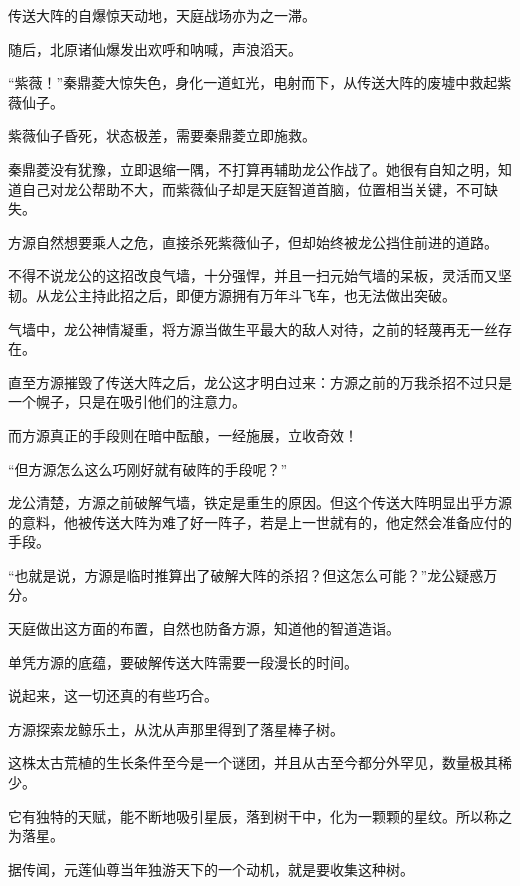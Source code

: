 
\begin{this_body}



传送大阵的自爆惊天动地，天庭战场亦为之一滞。

随后，北原诸仙爆发出欢呼和呐喊，声浪滔天。

“紫薇！”秦鼎菱大惊失色，身化一道虹光，电射而下，从传送大阵的废墟中救起紫薇仙子。

紫薇仙子昏死，状态极差，需要秦鼎菱立即施救。

秦鼎菱没有犹豫，立即退缩一隅，不打算再辅助龙公作战了。她很有自知之明，知道自己对龙公帮助不大，而紫薇仙子却是天庭智道首脑，位置相当关键，不可缺失。

方源自然想要乘人之危，直接杀死紫薇仙子，但却始终被龙公挡住前进的道路。

不得不说龙公的这招改良气墙，十分强悍，并且一扫元始气墙的呆板，灵活而又坚韧。从龙公主持此招之后，即便方源拥有万年斗飞车，也无法做出突破。

气墙中，龙公神情凝重，将方源当做生平最大的敌人对待，之前的轻蔑再无一丝存在。

直至方源摧毁了传送大阵之后，龙公这才明白过来：方源之前的万我杀招不过只是一个幌子，只是在吸引他们的注意力。

而方源真正的手段则在暗中酝酿，一经施展，立收奇效！

“但方源怎么这么巧刚好就有破阵的手段呢？”

龙公清楚，方源之前破解气墙，铁定是重生的原因。但这个传送大阵明显出乎方源的意料，他被传送大阵为难了好一阵子，若是上一世就有的，他定然会准备应付的手段。

“也就是说，方源是临时推算出了破解大阵的杀招？但这怎么可能？”龙公疑惑万分。

天庭做出这方面的布置，自然也防备方源，知道他的智道造诣。

单凭方源的底蕴，要破解传送大阵需要一段漫长的时间。

说起来，这一切还真的有些巧合。

方源探索龙鲸乐土，从沈从声那里得到了落星棒子树。

这株太古荒植的生长条件至今是一个谜团，并且从古至今都分外罕见，数量极其稀少。

它有独特的天赋，能不断地吸引星辰，落到树干中，化为一颗颗的星纹。所以称之为落星。

据传闻，元莲仙尊当年独游天下的一个动机，就是要收集这种树。


\end{this_body}
